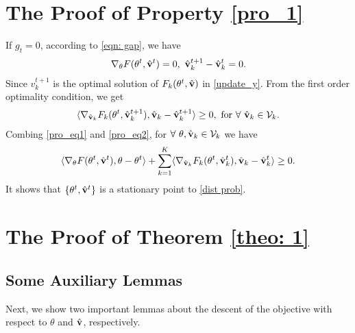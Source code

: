 \documentclass[twoside,journal]{IEEEtran}
\def\VectorFont{\bf}
\newcommand{\vv}{{\VectorFont v}}
\begin{document}
\section{The Proof of Property \ref{pro_1}}\label{proof_property}
If $g_t=0$, according to \eqref{eqn: gap}, we have
\begin{align}\label{pro_eq1}
\nabla_{\theta}F(\theta^t,\hat{\vv}^{t})=0,~
\hat{\vv}_{k}^{t+1}-\hat{\vv}_{k}^{t}=0.
\end{align}
Since $v_{k}^{t+1}$ is the optimal solution of $F_k(\theta^t,\hat{\vv})$ in \eqref{update_y}. From the first order optimality condition, we get
\begin{align}\label{pro_eq2}
\langle\nabla_{\hat{\vv}_k}F_k(\theta^t,\hat{\vv}_k^{t+1}), \hat{\vv}_k-\hat{\vv}_k^{t+1}\rangle\geq 0,~ \textmd{for} ~ \forall ~\hat{\vv}_k\in \mathcal{V}_k.
\end{align}
Combing \eqref{pro_eq1} and \eqref{pro_eq2}, for $\forall ~\theta, \hat{\vv}_k\in \mathcal{V}_k$ we have
\begin{align*}
\langle\nabla_{\theta}F(\theta^t,\hat{\vv}^{t}), \theta-\theta^t \rangle+ \sum_{k=1}^K\langle\nabla_{\hat{\vv}_k}F_k(\theta^t,\hat{\vv}_k^{t}), \hat{\vv}_k-\hat{\vv}_k^{t}\rangle\geq 0.
\end{align*}
It shows that $\{\theta^t,\hat{\vv}^t\}$ is a stationary
point to \eqref{dist prob}.
\section{The Proof of Theorem \ref{theo: 1}}\label{proof_theorem}
\subsection{Some Auxiliary Lemmas}
Next, we show two important lemmas about the descent of the objective with respect to $\theta$ and $\hat \vv$, respectively.
\end{document}
